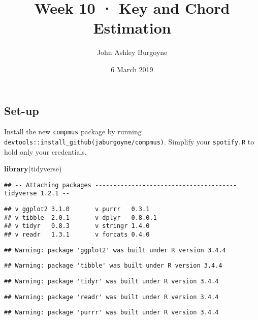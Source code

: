 \documentclass[]{article}
\title{Week 10 · Key and Chord Estimation}
\author{John Ashley Burgoyne}
\date{6 March 2019}
\newenvironment{Shaded}{\begin{snugshade}}{\end{snugshade}}
\newcommand{\KeywordTok}[1]{\textcolor[rgb]{0.13,0.29,0.53}{\textbf{#1}}}
\newcommand{\NormalTok}[1]{#1}
\begin{document}
\maketitle

\hypertarget{set-up}{%
\subsection{Set-up}\label{set-up}}

Install the new \texttt{compmus} package by running
\texttt{devtools::install\_github(\textquotesingle{}jaburgoyne/compmus\textquotesingle{})}.
Simplify your \texttt{spotify.R} to hold only your credentials.

\begin{Shaded}
\begin{Highlighting}[]
\KeywordTok{library}\NormalTok{(tidyverse)}
\end{Highlighting}
\end{Shaded}

\begin{verbatim}
## -- Attaching packages --------------------------------------- tidyverse 1.2.1 --
\end{verbatim}

\begin{verbatim}
## v ggplot2 3.1.0       v purrr   0.3.1  
## v tibble  2.0.1       v dplyr   0.8.0.1
## v tidyr   0.8.3       v stringr 1.4.0  
## v readr   1.3.1       v forcats 0.4.0
\end{verbatim}

\begin{verbatim}
## Warning: package 'ggplot2' was built under R version 3.4.4
\end{verbatim}

\begin{verbatim}
## Warning: package 'tibble' was built under R version 3.4.4
\end{verbatim}

\begin{verbatim}
## Warning: package 'tidyr' was built under R version 3.4.4
\end{verbatim}

\begin{verbatim}
## Warning: package 'readr' was built under R version 3.4.4
\end{verbatim}

\begin{verbatim}
## Warning: package 'purrr' was built under R version 3.4.4
\end{verbatim}
\end{document}
